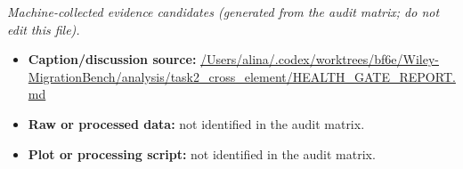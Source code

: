 \emph{Machine-collected evidence candidates (generated from the audit matrix; do not edit this file).}
\begin{itemize}[leftmargin=1.4em,noitemsep]
\item \textbf{Caption/discussion source:} \url{/Users/alina/.codex/worktrees/bf6e/Wiley-MigrationBench/analysis/task2_cross_element/HEALTH_GATE_REPORT.md}
\item \textbf{Raw or processed data:} not identified in the audit matrix.
\item \textbf{Plot or processing script:} not identified in the audit matrix.
\end{itemize}
